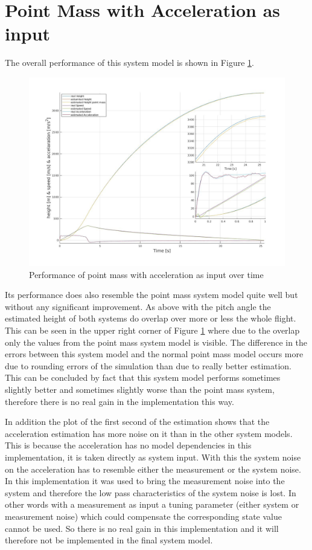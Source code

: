 \newpage
\section{Point Mass with Acceleration as input}
The overall performance of this system model is shown in Figure \ref{fig:PointMassAccInputPerformance}.

\begin{figure}[h!]
 \centering
 \includegraphics[width=.8 \textwidth]{./Pictures/PointMassAccInputPerformance.jpg}
 \caption{Performance of point mass with acceleration as input over time}
 \label{fig:PointMassAccInputPerformance}
\end{figure}

Its performance does also resemble the point mass system model quite well but without any significant improvement.
As above with the pitch angle the estimated height of both systems do overlap over more or less the whole flight.
This can be seen in the upper right corner of Figure \ref{fig:PointMassAccInputPerformance} where due to the overlap only the values from the point mass system model is visible.
The difference in the errors between this system model and the normal point mass model occurs more due to rounding errors of the simulation than due to really better estimation.
This can be concluded by fact that this system model performs sometimes slightly better and sometimes slightly worse than the point mass system, therefore there is no real gain in the implementation this way.

In addition the plot of the first second of the estimation shows that the acceleration estimation has more noise on it than in the other system models.
This is because the acceleration has no model dependencies in this implementation, it is taken directly as system input.
With this the system noise on the acceleration has to resemble either the measurement or the system noise.
In this implementation it was used to bring the measurement noise into the system and therefore the low pass characteristics of the system noise is lost.
In other words with a measurement as input a tuning parameter (either system or measurement noise) which could compensate the corresponding state value cannot be used.
So there is no real gain in this implementation and it will therefore not be implemented in the final system model.

